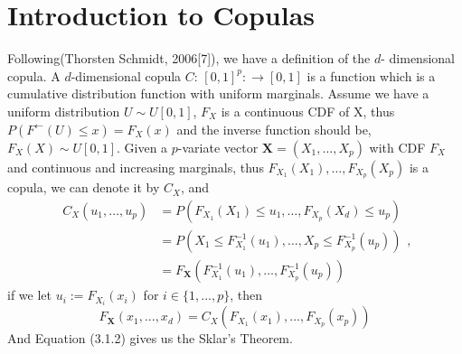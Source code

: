\documentclass[mstat,12pt]{unswthesis}  %
\numberwithin{equation}{section}
\begin{document}
\section{Introduction to Copulas}
Following(Thorsten Schmidt, 2006[7]), we have a definition of the $d$- dimensional copula. A $d$-dimensional copula $C$: $[0,1]^{p}: \rightarrow[0,1]$ is a function which is a cumulative distribution function with uniform marginals. Assume we have a uniform distribution $U \sim U[0,1]$, $F_X$ is a continuous CDF of X, thus
$P\left(F^{\leftarrow}(U) \leq x\right)=F_{X}(x)$ and the inverse function should be,
$F_{X}(X) \sim U[0,1]$. Given a $p$-variate vector $\mathbf{X}=\left(X_{1}, \ldots, X_{p}\right)$ with CDF $F_X$ and continuous and increasing marginals, thus $F_{X_{1}}\left(X_{1}\right), \ldots, F_{X_{p}}\left(X_{p}\right)$ is a copula, we can denote it by $C_X$, and
\begin{equation}
    \begin{aligned} C_{X}\left(u_{1}, \ldots, u_{p}\right) &=P\left(F_{X_{1}}\left(X_{1}\right) \leq u_{1}, \ldots, F_{X_{p}}\left(X_{d}\right) \leq u_{p}\right) \\ &=P\left(X_{1} \leq F_{X_{1}}^{-1}\left(u_{1}\right), \ldots, X_{p} \leq F_{X_{p}}^{-1}\left(u_{p}\right)\right) \\ &=F_{\mathbf{X}}\left(F_{X_{1}}^{-1}\left(u_{1}\right), \ldots, F_{X_{p}}^{-1}\left(u_{p}\right)\right) \end{aligned},
\end{equation}
if we let $u_{i}:=F_{X_{i}}\left(x_{i}\right)$ for $i \in \{1,...,p\}$, then
\begin{equation}
F_{\mathbf{X}}\left(x_{1}, \ldots, x_{d}\right)=C_{X}\left(F_{X_{1}}\left(x_{1}\right), \ldots, F_{X_{p}}\left(x_{p}\right)\right)
\end{equation}
And Equation (3.1.2) gives us the Sklar's Theorem.
\end{document}
